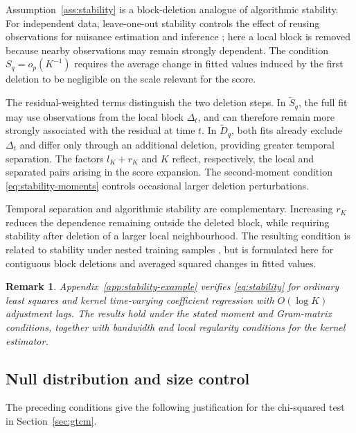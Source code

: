 \documentclass[12pt]{article}
\newtheorem{remark}[theorem]{Remark}
\numberwithin{equation}{section}
\begin{document}
Assumption~\ref{ass:stability} is a block-deletion analogue of algorithmic
stability. For independent data, leave-one-out stability controls the effect
of reusing observations for nuisance estimation and inference
\citep{barber2021predictive,chen2022debiased}; here a local block is removed
because nearby observations may remain strongly dependent. The condition
\(S_q=o_p(K^{-1})\) requires the average change in fitted values induced by
the first deletion to be negligible on the scale relevant for the score.

The residual-weighted terms distinguish the two deletion steps. In
\(\tilde S_q\), the full fit may use observations from the local block
\(\Delta_t\), and can therefore remain more strongly associated with the
residual at time \(t\). In \(\tilde D_q\), both fits already exclude
\(\Delta_t\) and differ only through an additional deletion, providing
greater temporal separation. The factors \(l_K+r_K\) and \(K\) reflect,
respectively, the local and separated pairs arising in the score expansion.
The second-moment condition \eqref{eq:stability-moments} controls occasional
larger deletion perturbations.

Temporal separation and algorithmic stability are complementary. Increasing
\(r_K\) reduces the dependence remaining outside the deleted block, while
requiring stability after deletion of a larger local neighbourhood. The
resulting condition is related to stability under nested training samples
\citep[Definitions~3.1 and~3.4]{liang2025algorithmic}, but is formulated here
for contiguous block deletions and averaged squared changes in fitted values.

\begin{remark}
\label{rem:example-stability}
Appendix~\ref{app:stability-example} verifies \eqref{eq:stability} for ordinary least squares and kernel time-varying coefficient regression with \(O(\log K)\) adjustment lags. The results hold under the stated moment and Gram-matrix conditions, together with bandwidth and local regularity conditions for the kernel estimator.
\end{remark}


\subsection{Null distribution and size control}
\label{sec:null_limits}

The preceding conditions give the following justification
for the chi-squared test in Section~\ref{sec:gtcm}.
\end{document}
